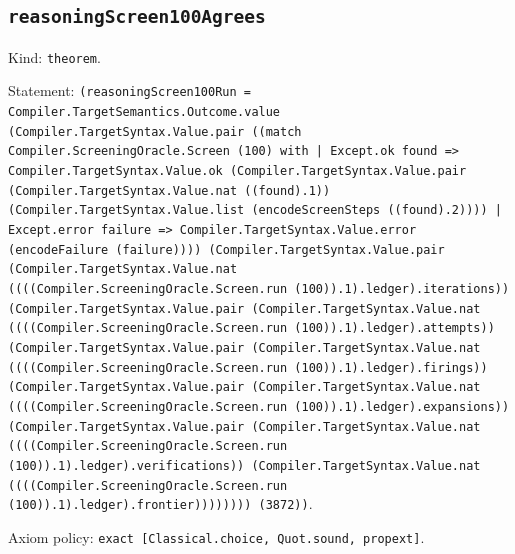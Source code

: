 \documentclass[11pt]{article}
\begin{document}
\subsection*{\texttt{reasoningScreen100Agrees}}
\noindent Kind: \texttt{theorem}.\par
\noindent Statement: \texttt{(reasoningScreen100Run = Compiler.TargetSemantics.Outcome.value (Compiler.TargetSyntax.Value.pair ((match Compiler.ScreeningOracle.Screen (100) with | Except.ok found => Compiler.TargetSyntax.Value.ok (Compiler.TargetSyntax.Value.pair (Compiler.TargetSyntax.Value.nat ((found).1)) (Compiler.TargetSyntax.Value.list (encodeScreenSteps ((found).2)))) | Except.error failure => Compiler.TargetSyntax.Value.error (encodeFailure (failure)))) (Compiler.TargetSyntax.Value.pair (Compiler.TargetSyntax.Value.nat ((((Compiler.ScreeningOracle.Screen.run (100)).1).ledger).iterations)) (Compiler.TargetSyntax.Value.pair (Compiler.TargetSyntax.Value.nat ((((Compiler.ScreeningOracle.Screen.run (100)).1).ledger).attempts)) (Compiler.TargetSyntax.Value.pair (Compiler.TargetSyntax.Value.nat ((((Compiler.ScreeningOracle.Screen.run (100)).1).ledger).firings)) (Compiler.TargetSyntax.Value.pair (Compiler.TargetSyntax.Value.nat ((((Compiler.ScreeningOracle.Screen.run (100)).1).ledger).expansions)) (Compiler.TargetSyntax.Value.pair (Compiler.TargetSyntax.Value.nat ((((Compiler.ScreeningOracle.Screen.run (100)).1).ledger).verifications)) (Compiler.TargetSyntax.Value.nat ((((Compiler.ScreeningOracle.Screen.run (100)).1).ledger).frontier)))))))) (3872))}.\par
\noindent Axiom policy: \texttt{exact [Classical.choice, Quot.sound, propext]}.\par
\end{document}
